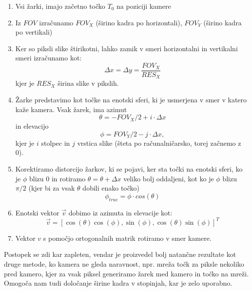 \documentclass[titlepage]{article}
\begin{document}
\begin{enumerate}
  \item Vsi žarki, imajo začetno točko \(T_{0}\) na poziciji kamere
  \item Iz \( FOV \) izračunamo \( FOV_X \) (širino kadra po horizontali), \( FOV_Y \) (širino kadra po vertikali)
  \item Ker so piksli slike štirikotni, lahko zamik v smeri horizontalni in vertikalni smeri izračunamo kot:
  \[\Delta x = \Delta y = \frac{FOV_X}{RES_X} \] kjer je \(RES_X\) širina slike v pikslih.
  \item Žarke predstavimo kot točke na enotski sferi, ki je usmerjena v smer v katero kaže kamera. Vsak žarek, 
  ima azimut \[ \theta = -FOV_X/2 + i \cdot \Delta x \] in elevacijo \[ \phi = FOV_Y/2 - j \cdot \Delta x, \]
  kjer je \( i \) stolpec in \( j \) vrstica slike (šteta po računalničarsko, torej začnemo z 0).
  \item Korektiramo distorcijo žarkov, ki se pojavi, ker sta točki na enotski sferi, ko je \( \phi \) blizu 0 in 
  rotiramo \(\theta =\theta + \Delta x \) veliko bolj oddaljeni, kot ko je \( \phi \) blizu \( \pi/2 \) 
  (kjer bi za vsak \( \theta \) dobili enako točko) \[ \phi_{true} = \phi \cdot cos(\theta) \]
  \item Enotski vektor \( \vec{v} \) dobimo iz azimuta in elevacije kot:
  \[ \vec{v} = [ \cos(\theta) \cos(\phi), \sin(\phi), \cos(\theta) \sin(\phi) ]^T \]
  \item Vektor \(v\) s pomočjo ortogonalnih matrik rotiramo v smer kamere.
\end{enumerate}
Postopek se zdi kar zapleten, vendar je proizvedel bolj natančne rezultate kot druge metode, ko 
kamera ne gleda naravnost, npr. mreža točk za piksle nekoliko pred kamero, kjer za vsak piksel generiramo žarek 
med kamero in točko na mreži. Omogoča nam tudi določanje širine kadra v stopinjah, kar je zelo uporabno.
\end{document}
